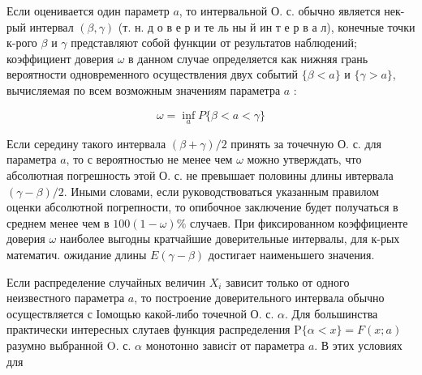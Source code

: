 \documentclass[10pt]{article}
\begin{document}
Если оценивается один параметр $a$, то интервальной О. с. обычно является нек-рый интервал $(\beta, \gamma)$ (т. н. д о в е р и те ль ны й ин т е р в а л), конечные точки к-рого $\beta$ и $\gamma$ представляют собой функции от результатов наблюдений; коэффициент доверия $\omega$ в данном случае определяется как нижняя грань вероятности одновременного осуществления двух событий $\{\beta<a\}$ и $\{\gamma>a\}$, вычисляемая по всем возможным значениям параметра $a$ :



\[

\omega=\inf _{a} P\{\beta<a<\gamma\}

\]



Если середину такого интервала $(\beta+\gamma) / 2$ принять за точечную О. с. для параметра $a$, то с вероятностью не менее чем $\omega$ можно утверждать, что абсолютная погрешность этой $О$. с. не превышает половины длины ивтервала $(\gamma-\beta) / 2$. Иными словами, если руководствоваться указанным правилом оценки абсолютной погрепности, то опибочное заключение будет получаться в среднем менее чем в $100(1-\omega) \%$ случаев. При фиксированном коэффициенте доверия $\omega$ наиболее выгодны кратчайшие доверительные интервалы, для к-рых математич. ожидание длины $E(\gamma-\beta)$ достигает наименьшего значения.



Если распределение случайных величин $X_{i}$ зависит только от одного неизвестного параметра $a$, то построение доверительного интервала обычно осуществляется с Іомощью какой-либо точечной О. с. $\alpha$. Для большинства практически интересных слутаев функция распределения $\mathrm{P}\{\alpha<x\}=F(x ; a)$ разумно выбранной $\mathrm{O}$. с. $\alpha$ монотонно зависіт от параметра $a$. В этих условиях для
\end{document}
